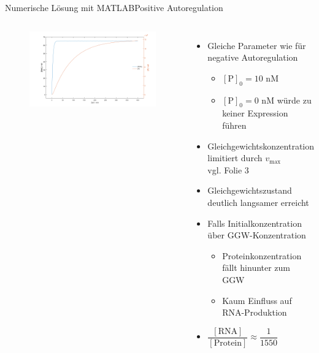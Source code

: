 \documentclass[11pt,aspectratio=169,reqno]{beamer}
\begin{document}
\begin{frame}{Numerische Lösung mit MATLAB\hfill {\small\textcolor{ETHBlue}{Positive Autoregulation}}}
    \begin{columns}
        \begin{figure}
            \centering
            \includegraphics[width=\linewidth]{images/simulations/positive_autoregulation_basic.m.png}
        \end{figure}

        \begin{itemize}
            \item Gleiche Parameter wie für negative Autoregulation
            \begin{itemize}
                \item $[\text{P}]_0=10\text{ nM}$
                \item $[\text{P}]_0=0\text{ nM}$ würde zu keiner Expression führen
            \end{itemize}
            \item Gleichgewichtskonzentration limitiert durch $v_\text{max}$\\ {\tiny vgl. Folie 3}
            \item Gleichgewichtszustand deutlich langsamer erreicht
            \item Falls Initialkonzentration über GGW-Konzentration
            \begin{itemize}
                \item Proteinkonzentration fällt hinunter zum GGW
                \item Kaum Einfluss auf RNA-Produktion
            \end{itemize}
            \item $\dfrac{[\text{RNA}]}{[\text{Protein}]}\approx \dfrac{1}{1550}$
        \end{itemize}
    \end{columns}
\end{frame}
\end{document}
